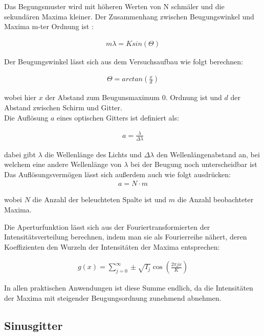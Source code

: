 \documentclass[12pt]{article}
\begin{document}
Das Begungsmuster wird mit höheren Werten von N schmäler und die sekundären Maxima kleiner. Der Zusammenhang zwischen Beugungswinkel und Maxima m-ter Ordnung ist \cite{Demtröder}:

\begin{align}
m\lambda = Ksin(\Theta) \label{11} 
\end{align}

Der Beugungswinkel lässt sich aus dem Versuchsaufbau wie folgt berechnen:

\begin{align}
\Theta = \mathit{arctan}\left( \frac{x}{d}\right) 
\end{align}

wobei hier $x$ der Abstand zum Beugunsmaximum 0. Ordnung ist und $d$ der Abstand zwischen Schirm und Gitter.\\

Die Auflösung $a$ eines optischen Gitters ist definiert als:  \label{aufloesung}

\begin{align}
a = \frac{\lambda}{\Delta \lambda}
\end{align}

dabei gibt $\lambda$ die Wellenlänge des Lichts und $\Delta \lambda$ den Wellenlängenabstand an, bei welchem eine andere Wellenlänge von $\lambda$ bei der Beugung noch unterscheidbar ist \cite{Anleitung}
Das Auflösungsvermögen lässt sich außerdem auch wie folgt ausdrücken:
\begin{align}
a = N \cdot m 
\end{align}

wobei $N$ die Anzahl der beleuchteten Spalte ist und $m$ die Anzahl beobachteter Maxima.

Die Aperturfunktion lässt sich aus der Fouriertransformierten der Intensitätsverteilung berechnen, indem man sie als Fourierreihe nähert, deren Koeffizienten den Wurzeln der Intensitäten der Maxima entsprechen:

\begin{align}
g(x) = \sum_{j = 0}^{\infty} \pm \sqrt{I_j}\cos\left( \frac{2 \pi j x}{K}\right) \label{Fourier1}
\end{align} 

In allen praktischen Anwendungen ist diese Summe endlich, da die Intensitäten der Maxima mit steigender Beugungsordnung zunehmend abnehmen. 

\subsection{Sinusgitter}
\end{document}
